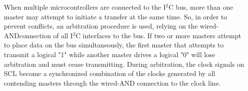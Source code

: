 When multiple microcontrollers are connected to the I$^2$C bus, more than one 
master may attempt to initiate a transfer at the same time. So, in order to prevent 
conflicts, an arbitration procedure is used, relying on the wired-AND\footnotemark[2] connection of 
all I$^2$C interfaces to the bus. If two or more masters attempt to place data on the 
bus simultaneously, the first master that attempts to transmit a logical "1" while 
another master drives a logical "0" will lose arbitration and must cease transmitting. 
During arbitration, the clock signals on SCL become a synchronized combination of 
the clocks generated by all contending masters through the wired-AND connection 
to the clock line.


